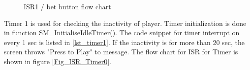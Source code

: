 \documentclass[a4paper,13pt,openany,sffamily]{memoir}
\begin{document}
\begin{figure}[h]
\caption{ISR1 / bet button flow chart }
\label{Fig_ISR1_Loop}
\end{figure}

Timer 1 is used for checking the inactivity of player. Timer initialization is done in function SM\_InitialiseIdleTimer(). The code snippet for timer interrupt on every 1 sec is listed in \ref{lst_timer1}. If the inactivity is for more than 20 sec, the screen throws "Press to Play" to message. The flow chart for ISR for Timer is shown in figure \ref{Fig_ISR_Timer0}. 
\end{document}
